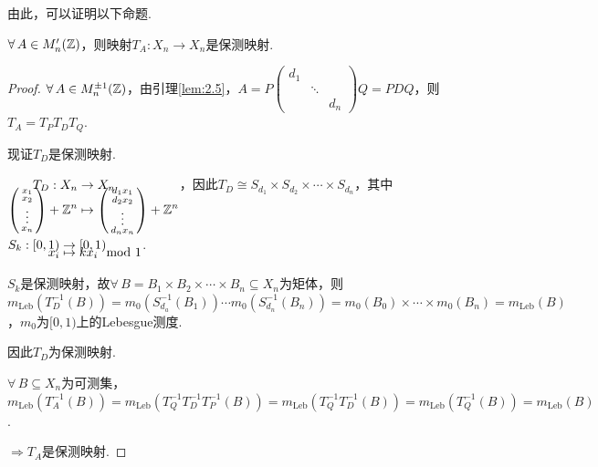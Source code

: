 由此，可以证明以下命题.
\begin{proposition}
    $\forall\,A\in M'_n(\mathbb{Z})$，则映射$T_A:X_n\to X_n$是保测映射.
\end{proposition}
\begin{proof}
    $\forall\,A\in M^{\pm 1}_n(\mathbb{Z})$，由引理\ref{lem:2.5}，$A=P\left(\begin{smallmatrix}
        d_1 & & \\
        & \ddots & \\
        & & d_n
    \end{smallmatrix}\right)Q=PDQ$，则$T_A=T_PT_DT_Q$.\par
    现证$T_D$是保测映射.\par
    $\setjot[-6]\begin{aligned}[t]
        T_D:X_n &\to X_n \\
        \left(\begin{smallmatrix}
            x_1 \\ x_2 \\\vdots \\x_n
        \end{smallmatrix}\right)+\mb{Z}^n &\mapsto \left(\begin{smallmatrix}
        d_1 x_1 \\ d_2 x_2 \\\vdots \\d_n x_n
    \end{smallmatrix}\right)+\mb{Z}^n
    \end{aligned}$，因此$T_D\cong S_{d_1}\times S_{d_2}\times\cdots\times S_{d_n}$，其中$\setjot[-6]\begin{aligned}[t]
        S_{k}:[0,1) &\to [0,1) \\
        x_i &\mapsto kx_i \mod 1
    \end{aligned}$.\par
    $S_k$是保测映射，故$\forall\, B=B_1\times B_2\times \cdots\times B_n\subseteq X_n$为矩体，则$m_\mathrm{Leb}\left(T^{-1}_D(B)\right)=m_0 \left(S^{-1}_{d_a}(B_1)\right)\cdots m_0 \left(S^{-1}_{d_n}(B_n)\right)=m_0(B_0)\times\cdots\times m_0(B_n)=m_\mathrm{Leb}(B)$，$m_0$为$[0,1)$上的Lebesgue测度. \par
    因此$T_D$为保测映射.\par
    $\forall\, B\subseteq X_n$为可测集，$m_\mathrm{Leb} \left(T^{-1}_A(B)\right)=m_\mathrm{Leb}(T^{-1}_Q T^{-1}_D T^{-1}_P(B))=m_\mathrm{Leb}(T^{-1}_Q T^{-1}_D (B))=m_\mathrm{Leb}(T^{-1}_Q(B))=m_\mathrm{Leb}(B)$.\par
    $\Rightarrow T_A$是保测映射.
\end{proof}

